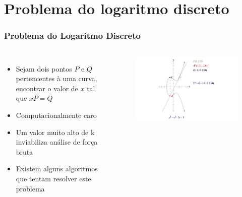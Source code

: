 \documentclass{beamer}
\begin{document}
\section{Problema do logaritmo discreto}
\begin{frame}
\frametitle{Problema do Logaritmo Discreto}
  \begin{columns}[c]
      \begin{itemize}
        \item Sejam dois pontos $P$ e $Q$ pertencentes à uma curva, encontrar o valor de $x$ tal que $xP = Q$
        \item Computacionalmente caro
        \item Um valor muito alto de k inviabiliza análise de força bruta
        \item Existem alguns algoritmos que tentam resolver este problema
      \end{itemize}

      \begin{figure}
        \includegraphics[scale=0.3]{multiplicacao_ponto}
      \end{figure}
  \end{columns}
\end{frame}
\end{document}
